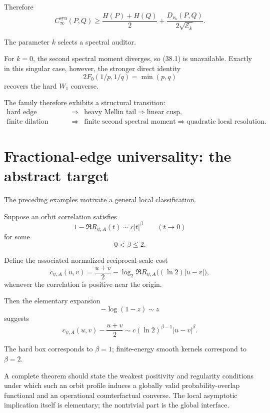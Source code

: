 \documentclass[11pt,a4paper]{article}
\newcommand{\CinfSyn}{C_{\infty}^{\mathrm{syn}}}
\newcommand{\1}{\mathbf 1}
\begin{document}
Therefore
\[
\boxed{
\CinfSyn(P,Q)
\ge
\frac{H(P)+H(Q)}2
+
\frac{
D_{\nu_k}(P,Q)
}{
2\sqrt{\mathcal E_k}
}.
}
\tag{38.1}
\]

The parameter \(k\) selects a spectral auditor.

For \(k=0\), the second spectral moment diverges, so
(38.1) is unavailable.
Exactly in this singular case, however, the stronger direct identity
\[
2F_0(1/p,1/q)=\min(p,q)
\tag{38.2}
\]
recovers the hard \(W_1\) converse.

The family therefore exhibits a structural transition:
\[
\boxed{
\begin{array}{ccl}
\text{hard edge}
&\Longrightarrow&
\text{heavy Mellin tail}
\Longrightarrow
\text{linear cusp},
\\[1mm]
\text{finite dilation energy}
&\Longrightarrow&
\text{finite second spectral moment}
\Longrightarrow
\text{quadratic local resolution}.
\end{array}
}
\tag{38.3}
\]


\section{Fractional-edge universality: the abstract target}

The preceding examples motivate a general local classification.

Suppose an orbit correlation satisfies
\[
1-\Re R_{\psi,A}(t)
\sim
c|t|^\beta
\qquad
(t\to0)
\tag{39.1}
\]
for some
\[
0<\beta\le2.
\]

Define the associated normalized reciprocal-scale cost
\[
c_{\psi,A}(u,v)
=
\frac{u+v}{2}
-
\log_2
\Re R_{\psi,A}
\bigl(
(\ln2)|u-v|
\bigr),
\tag{39.2}
\]
whenever the correlation is positive near the origin.

Then the elementary expansion
\[
-\log(1-z)\sim z
\]
suggests
\[
\boxed{
c_{\psi,A}(u,v)
-
\frac{u+v}{2}
\sim
c(\ln2)^{\beta-1}
|u-v|^\beta.
}
\tag{39.3}
\]

The hard box corresponds to \(\beta=1\);
finite-energy smooth kernels correspond to \(\beta=2\).

A complete theorem should state the weakest positivity and regularity
conditions under which such an orbit profile induces a globally valid
probability-overlap functional and an operational counterfactual
converse.
The local asymptotic implication itself is elementary; the nontrivial
part is the global interface.
\end{document}
